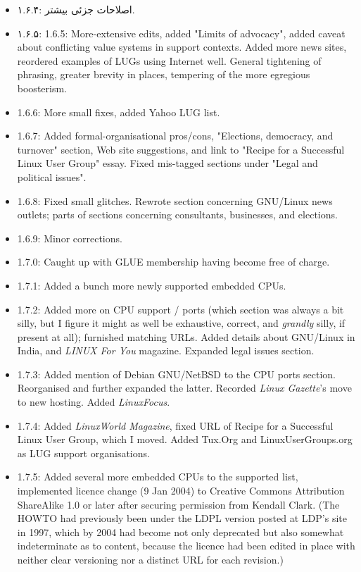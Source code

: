 \begin{itemize}
\item
۱.۶.۴: اصلاحات جزئی بیشتر.
\item
۱.۶.۵:‌ 
1.6.5: More-extensive edits, added "Limits of advocacy",
added caveat about conflicting value systems in support contexts.  Added
more news sites, reordered examples of LUGs using Internet well.  General 
tightening of phrasing, greater brevity in places, tempering of the more
egregious boosterism.
\item 1.6.6: More small fixes, added Yahoo LUG list.
\item 1.6.7: Added formal-organisational pros/cons, "Elections,
democracy, and turnover" section, Web site suggestions, and link
to "Recipe for a Successful Linux User Group" essay. Fixed mis-tagged 
sections under "Legal and political issues".
\item 1.6.8: Fixed small glitches.  Rewrote section concerning
GNU/Linux news outlets; parts of sections concerning consultants, businesses,
and elections.
\item 1.6.9: Minor corrections.
\item 1.7.0: Caught up with GLUE membership having become free
of charge.
\item 1.7.1: Added a bunch more newly supported embedded CPUs.
\item 1.7.2: Added more on CPU support / ports (which section was always a bit silly, but I figure it might as well be exhaustive, correct, and {\itshape grandly\/} silly, if present at all); furnished matching URLs.  Added details about GNU/Linux in India, and {\itshape LINUX For You\/} magazine.  Expanded legal issues section.
\item 1.7.3: Added mention of Debian GNU/NetBSD to the CPU ports 
section.  Reorganised and further expanded the latter.  Recorded {\itshape Linux
Gazette\/}'s move to new hosting.  Added {\itshape LinuxFocus\/}.
\item 1.7.4: Added {\itshape LinuxWorld Magazine\/}, fixed URL of Recipe for
a Successful Linux User Group, which I moved.  Added Tux.Org and 
LinuxUserGroups.org as LUG support organisations.
\item 1.7.5: Added several more embedded CPUs to the supported list, implemented licence change (9 Jan 2004) to Creative Commons Attribution ShareAlike 1.0 or later after securing permission from Kendall Clark. (The HOWTO had previously been under the LDPL version posted at LDP's site in 1997, which by 2004 had become not only deprecated but also somewhat indeterminate as to content, because the licence had been edited in place with neither clear versioning nor a distinct URL for each revision.)

\end{itemize}
